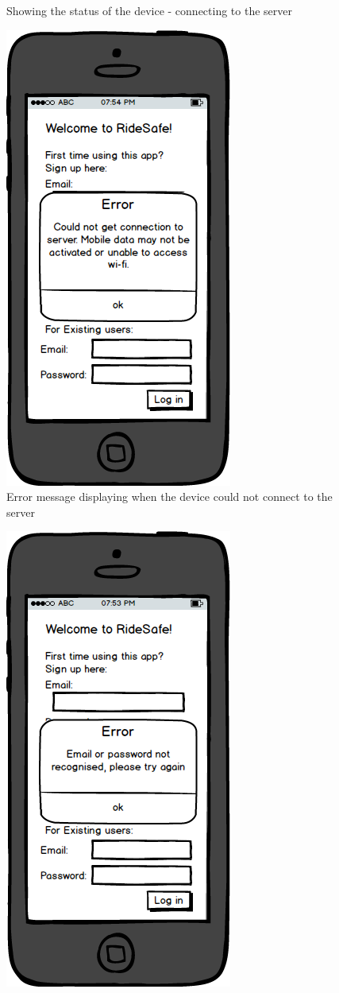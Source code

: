 \documentclass[a4paper]{report}
\begin{document}
{\begin{figure}
\caption{Showing the status of the device - connecting to the server}
\end{figure}
\clearpage
\begin{figure}
\centering
\includegraphics[scale=0.9]{figures/prototype_2/connect_err}
\caption{Error message displaying when the device could not connect to the server}
\end{figure}
\clearpage
\begin{figure}
\centering
\includegraphics[scale=0.9]{figures/prototype_2/unrecognised_err}

\end{figure}}
\end{document}
